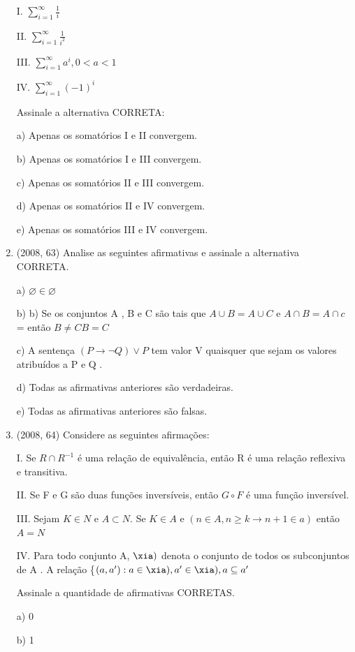 \documentclass{article}
\begin{document}
\begin{enumerate}
I. $\sum_{i=1}^{\infty} \frac{1}{i}$

II. $\sum_{i=1}^{\infty} \frac{1}{i^2}$

III. $\sum_{i=1}^{\infty} a^i, 0< a <1$

IV. $\sum_{i=1}^{\infty} (-1)^i$

Assinale a alternativa CORRETA:

a) Apenas os somatórios I e II convergem.

b) Apenas os somatórios I e III convergem.

c) Apenas os somatórios II e III convergem.

d) Apenas os somatórios II e IV convergem.

e) Apenas os somatórios III e IV convergem.\newline





\item(2008, 63) Analise as seguintes afirmativas e assinale a alternativa CORRETA.

a) $ \varnothing \in \varnothing$

b) b) Se os conjuntos A , B e C são tais que $ A \cup B = A \cup C$ e $A \cap B = A \cap c$= então $B \ne C B = C$

c) A sentença $(P \rightarrow \lnot Q) \lor P$ tem valor V quaisquer que sejam os valores atribuídos a P e Q .

d) Todas as afirmativas anteriores são verdadeiras.

e) Todas as afirmativas anteriores são falsas.\newline


\item(2008, 64) Considere as seguintes afirmações:

I. Se $R \cap R^{-1}$ é uma relação de equivalência, então R é uma relação reflexiva e transitiva. 

II. Se F e G são duas funções inversíveis, então $G \circ F$ é uma função inversível.

III. Sejam $K \in N$ e $A \subset N$. Se $ K \in A $ e $(n \in A, n \geq k \rightarrow n+1 \in a)$ então $ A=N$

IV. Para todo conjunto A, $\xia)$ denota o conjunto de todos os subconjuntos de A . A relação \{$(a,a'):a\in \xia), a' \in \xia), a \subseteq a' $

Assinale a quantidade de afirmativas CORRETAS.

a) 0

b) 1


\end{enumerate}
\end{document}
